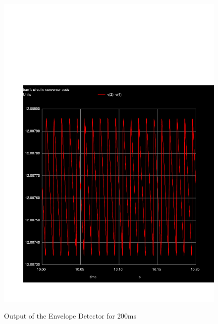\begin{figure}[ht] \centering
  \caption{Output of the Envelope Detector for 200ms}
  \includegraphics[width=0.8\linewidth]{../sim/envelope.pdf}
  \label{fig:envelope}
\end{figure}

\newpage

